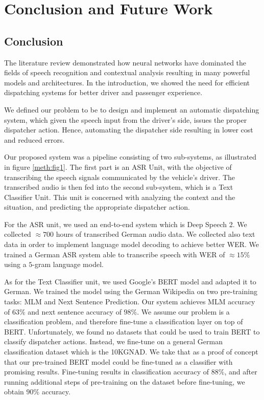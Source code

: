 \chapter{Conclusion and Future Work}
\label{chap:concl}

\section{Conclusion}
\label{conc:s1}

The literature review demonstrated how neural networks have dominated the fields of speech recognition and contextual analysis resulting in many powerful models and architectures. In the introduction, we showed the need for efficient dispatching systems for better driver and passenger experience. 

We defined our problem to be to design and implement an automatic dispatching system, which given the speech input from the driver's side, issues the proper dispatcher action. Hence, automating the dispatcher side resulting in lower cost and reduced errors. 

Our proposed system was a pipeline consisting of two sub-systems, as illustrated in figure \ref{meth:fig1}. The first part is an \acf{ASR} Unit, with the objective of transcribing the speech signals communicated by the vehicle's driver. The transcribed audio is then fed into the second sub-system, which is a Text Classifier Unit. This unit is concerned with analyzing the context and the situation, and predicting the appropriate dispatcher action.


For the \ac{ASR} unit, we used an end-to-end system which is Deep Speech 2. We collected $\approx 700$ hours of transcribed German audio data. We collected also text data in order to implement language model decoding to achieve better \ac{WER}. We trained a German \ac{ASR} system able to transcribe speech with \ac{WER} of $\approx 15\%$ using a $5$-gram language model. 

As for the Text Classifier unit, we used Google's \ac{BERT} model and adapted it to German. We trained the model using the German Wikipedia on two pre-training tasks: \acf{MLM} and Next Sentence Prediction. Our system achieves \ac{MLM} accuracy of $63\%$ and next sentence accuracy of $98\%$. We assume our problem is a classification problem, and therefore fine-tune a classification layer on top of \ac{BERT}. Unfortunately, we found no datasets that could be used to train \ac{BERT} to classify dispatcher actions. Instead, we fine-tune on a general German classification dataset which is the \acf{10KGNAD}. We take that as a proof of concept that our pre-trained \ac{BERT} model could be fine-tuned as a classifier with promising results. Fine-tuning results in classification accuracy of $88\%$, and after running additional steps of pre-training on the dataset before fine-tuning, we obtain $90\%$ accuracy.


